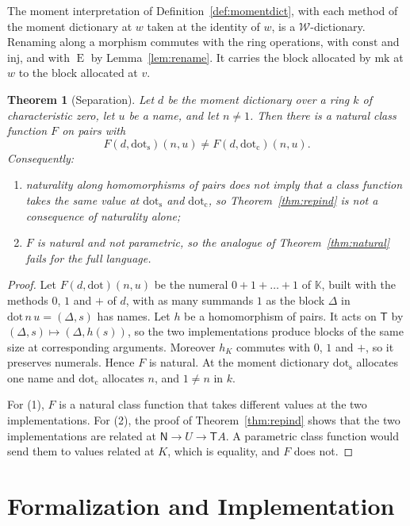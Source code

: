 \documentclass[11pt,a4paper]{report}
\theoremstyle{plain}
\newtheorem{theorem}{Theorem}[chapter]
\theoremstyle{definition}
\theoremstyle{remark}
\newcommand{\E}{\operatorname{E}}
\newcommand{\sK}{\mathbb{K}}
\newcommand{\T}{\mathsf{T}}
\newcommand{\Nat}{\mathsf{N}}
\newcommand{\W}{\mathcal{W}}
\newcommand{\mk}{\mathrm{mk}}
\begin{document}
The moment interpretation of Definition~\ref{def:momentdict}, with each method of
the moment dictionary at $w$ taken at the identity of $w$, is a $\W$-dictionary.
Renaming along a morphism commutes with the ring operations, with
$\mathrm{const}$ and $\mathrm{inj}$, and with $\E$ by Lemma~\ref{lem:rename}. It
carries the block allocated by $\mk$ at $w$ to the block allocated at $v$.

\begin{theorem}[Separation]
\label{thm:separation}
Let $d$ be the moment dictionary over a ring $k$ of characteristic zero, let $u$ be a 
name, and let $n \ne 1$. Then there is a natural class function $F$ on pairs with
\[
  F(d, \mathrm{dot}_{\mathrm{s}})(n, u) \ne F(d, \mathrm{dot}_{\mathrm{c}})(n, u) .
\]
Consequently:
\begin{enumerate}
\item naturality along homomorphisms of pairs does not imply that a class function takes
  the same value at $\mathrm{dot}_{\mathrm{s}}$ and $\mathrm{dot}_{\mathrm{c}}$,
  so Theorem~\ref{thm:repind} is not a consequence of naturality alone;
\item $F$ is natural and not parametric, so the analogue of
  Theorem~\ref{thm:natural} fails for the full language.
\end{enumerate}
\end{theorem}

\begin{proof}
Let $F(d, \mathrm{dot})(n, u)$ be the numeral $0 + 1 + \dots + 1$ of $\sK$, built
with the methods $0$, $1$ and $+$ of $d$, with as many summands $1$ as the block
$\Delta$ in $\mathrm{dot}\, n\, u = (\Delta, s)$ has names. Let $h$ be a
homomorphism of pairs. It acts on $\T$ by $(\Delta, s) \mapsto (\Delta, h(s))$,
so the two implementations produce blocks of the same size at corresponding
arguments. Moreover $h_K$ commutes with $0$, $1$ and $+$, so it preserves
numerals. Hence $F$ is natural. At the moment dictionary
$\mathrm{dot}_{\mathrm{s}}$ allocates one name and $\mathrm{dot}_{\mathrm{c}}$
allocates $n$, and $1 \ne n$ in $k$.

For (1), $F$ is a natural class function that takes different values at the two
implementations. For (2), the proof of Theorem~\ref{thm:repind} shows that the
two implementations are related at $\Nat \to U \to \T A$. A parametric class function
would send them to values related at $K$, which is equality, and $F$ does not.
\end{proof}

\chapter{Formalization and Implementation}
\label{ch:formal}
\end{document}
